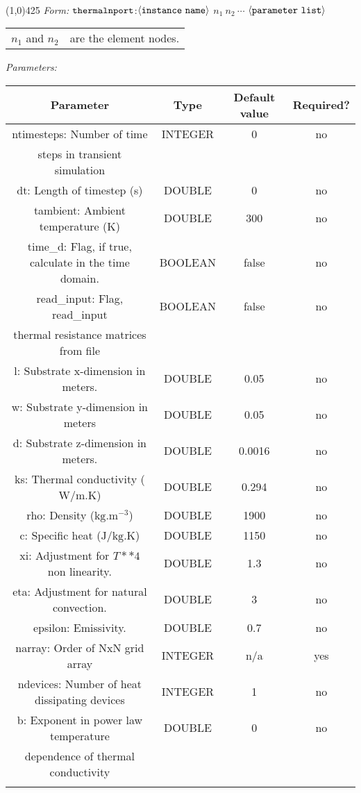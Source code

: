 \documentclass{article}
\begin{document}
\\
\hrulefill\linethickness{0.5mm}\line(1,0){425} \normalsize
\newline
\textit{Form:}
\newline
$\tt thermalnport$:$\langle \tt{instance\ name}\rangle$ $n_1\ n_2\
\cdots$ $\langle \tt{parameter\ list}\rangle$
\newline
\begin{tabular}{r l}
$n_1$ and $n_2$ & are the element nodes. \\
\end{tabular}
\newline
\textit{Parameters:}
\begin{table}[H]
\begin{tabular}{|c|c|c|c|}
\hline
Parameter&Type&Default value&Required?\\
\hline
ntimesteps: Number of time & INTEGER & 0 & no \\
steps in transient simulation & & & \\
\hline
dt: Length of timestep (s) & DOUBLE & 0 & no \\
\hline tambient: Ambient temperature (K) & DOUBLE & 300 & no \\
\hline time\_d: Flag, if true, calculate in the time domain. & BOOLEAN & false & no \\
\hline read\_input: Flag, read\_input & BOOLEAN & false & no\\
thermal resistance matrices from file & & & \\
\hline l: Substrate x-dimension in meters. & DOUBLE & 0.05 & no \\
\hline w: Substrate y-dimension in meters & DOUBLE & 0.05 & no \\
\hline d: Substrate z-dimension in meters. & DOUBLE & 0.0016 & no \\
\hline ks: Thermal conductivity {($\mathrm{W/{m.K}}$)} & DOUBLE & 0.294 & no \\
\hline rho: Density {($\mathrm{kg.{m^{-3}}}$)} & DOUBLE & 1900 & no \\
\hline c: Specific heat {($\mathrm{J/{kg.K}}$)} & DOUBLE & 1150 & no \\
\hline xi: Adjustment for $T\ast\ast4$ non linearity. & DOUBLE & 1.3 & no \\
\hline eta: Adjustment for natural convection. & DOUBLE & 3 & no \\
\hline epsilon: Emissivity. & DOUBLE & 0.7 & no \\
\hline narray: Order of NxN grid array & INTEGER & n/a & yes \\
\hline ndevices: Number of heat dissipating devices & INTEGER & 1 & no \\
\hline b: Exponent in power law temperature & DOUBLE & 0 & no \\
dependence of thermal conductivity & & & \\
\par
\hline
\end{tabular}
\end{table}
\end{document}
